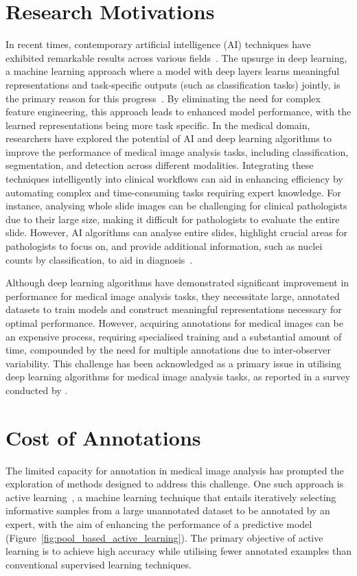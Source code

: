 \section{Research Motivations}
\label{sec:motivation}
In recent times, contemporary artificial intelligence (AI) techniques have exhibited remarkable results across various fields~\citep{sarker2021deep}. The upsurge in deep learning, a machine learning approach where a model with deep layers learns meaningful representations and task-specific outputs (such as classification tasks) jointly, is the primary reason for this progress~\citep{lecun2015deep}. By eliminating the need for complex feature engineering, this approach leads to enhanced model performance, with the learned representations being more task specific. In the medical domain, researchers have explored the potential of AI and deep learning algorithms to improve the performance of medical image analysis tasks, including classification, segmentation, and detection across different modalities. Integrating these techniques intelligently into clinical workflows can aid in enhancing efficiency by automating complex and time-consuming tasks requiring expert knowledge. For instance, analysing whole slide images can be challenging for clinical pathologists due to their large size, making it difficult for pathologists to evaluate the entire slide. However, AI algorithms can analyse entire slides, highlight crucial areas for pathologists to focus on, and provide additional information, such as nuclei counts by classification, to aid in diagnosis~\citep{dimitriou2019deep}.

Although deep learning algorithms have demonstrated significant improvement in performance for medical image analysis tasks, they necessitate large, annotated datasets to train models and construct meaningful representations necessary for optimal performance. However, acquiring annotations for medical images can be an expensive process, requiring specialised training and a substantial amount of time, compounded by the need for multiple annotations due to inter-observer variability. This challenge has been acknowledged as a primary issue in utilising deep learning algorithms for medical image analysis tasks, as reported in a survey conducted by \cite{litjens2017survey}.

\section{Cost of Annotations}
The limited capacity for annotation in medical image analysis has prompted the exploration of methods designed to address this challenge. One such approach is active learning~\citep{settles2009active}, a machine learning technique that entails iteratively selecting informative samples from a large unannotated dataset to be annotated by an expert, with the aim of enhancing the performance of a predictive model (Figure~\ref{fig:pool_based_active_learning}). The primary objective of active learning is to achieve high accuracy while utilising fewer annotated examples than conventional supervised learning techniques.

